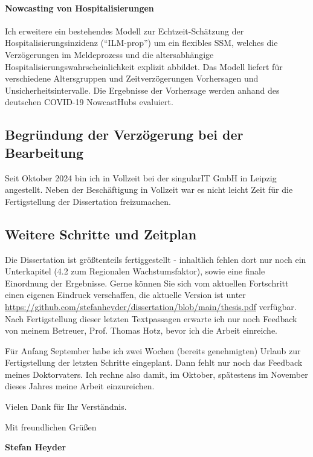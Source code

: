 \documentclass[a4paper,10pt]{article}
\begin{document}
\paragraph{Nowcasting von Hospitalisierungen}
Ich erweitere ein bestehendes Modell zur Echtzeit-Schätzung der Hospitalisierungsinzidenz (``ILM-prop'') um ein flexibles SSM, welches die Verzögerungen im Meldeprozess und die altersabhängige Hospitalisierungswahrscheinlichkeit explizit abbildet. Das Modell liefert für verschiedene Altersgruppen und Zeitverzögerungen Vorhersagen und Unsicherheitsintervalle. Die Ergebnisse der Vorhersage werden anhand des deutschen COVID-19 NowcastHubs evaluiert.

\subsection*{Begründung der Verzögerung bei der Bearbeitung}
Seit Oktober 2024 bin ich in Vollzeit bei der singularIT GmbH in Leipzig angestellt. Neben der Beschäftigung in Vollzeit war es nicht leicht Zeit für die Fertigstellung der Dissertation freizumachen.

\subsection*{Weitere Schritte und Zeitplan}
Die Dissertation ist größtenteils fertiggestellt - inhaltlich fehlen dort nur noch ein Unterkapitel (4.2 zum Regionalen Wachstumsfaktor), sowie eine finale Einordnung der Ergebnisse. Gerne können Sie sich vom aktuellen Fortschritt einen eigenen Eindruck verschaffen, die aktuelle Version ist unter \url{https://github.com/stefanheyder/dissertation/blob/main/thesis.pdf} verfügbar. Nach Fertigstellung dieser letzten Textpassagen erwarte ich nur noch Feedback von meinem Betreuer, Prof. Thomas Hotz, bevor ich die Arbeit einreiche. 

Für Anfang September habe ich zwei Wochen (bereits genehmigten) Urlaub zur Fertigstellung der letzten Schritte eingeplant. Dann fehlt nur noch das Feedback meines Doktorvaters. Ich rechne also damit, im Oktober, spätestens im November dieses Jahres meine Arbeit einzureichen.

\vspace{2em}
Vielen Dank für Ihr Verständnis.

Mit freundlichen Grüßen

\vspace{3em}
\textbf{Stefan Heyder}
\end{document}
